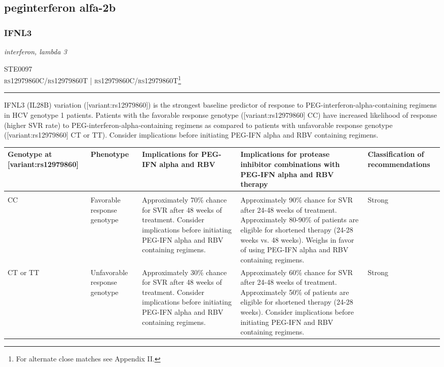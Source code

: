 \documentclass{report}
\begin{document}
\subsection{ peginterferon alfa-2b }

\subsubsection{ IFNL3 }
     \textit{ interferon, lambda 3 } \begin{flushright} \textsc{ STE0097 \\ rs12979860C/rs12979860T  | rs12979860C/rs12979860T\footnote{For alternate close matches see Appendix II.} }\end{flushright}
      \hrule \vspace{6pt}
      IFNL3 (IL28B) variation ([variant:rs12979860]) is the strongest baseline predictor of response to PEG-interferon-alpha-containing regimens in HCV genotype 1 patients.  Patients with the favorable response genotype ([variant:rs12979860] CC) have increased likelihood of response (higher SVR rate) to PEG-interferon-alpha-containing regimens as compared to patients with unfavorable response genotype ([variant:rs12979860] CT or TT). Consider implications before initiating PEG-IFN alpha and RBV containing regimens. \newline
      \scriptsize
      
      \begin{tabularx}{\textwidth}{ XXXXX }
      \textbf{ Genotype at [variant:rs12979860] }&\textbf{ Phenotype }&\textbf{ Implications for PEG-IFN alpha and RBV  }&\textbf{ Implications for protease inhibitor combinations with PEG-IFN alpha and RBV therapy }&\textbf{ Classification of recommendations  } \\ \hline \\  CC & Favorable response genotype & Approximately 70\% chance for SVR  after 48 weeks of treatment. Consider implications before initiating PEG-IFN alpha and RBV containing regimens. & Approximately 90\% chance for SVR after 24-48 weeks of treatment. Approximately 80-90\% of patients are eligible for shortened therapy (24-28 weeks vs. 48 weeks). Weighs in favor of using PEG-IFN alpha and RBV containing regimens.& Strong  \\  CT or TT & Unfavorable response genotype & Approximately 30\% chance for SVR  after 48 weeks of treatment. Consider implications before initiating PEG-IFN alpha and RBV containing regimens. & Approximately 60\% chance for SVR after 24-48 weeks of treatment. Approximately 50\% of patients are eligible for shortened therapy (24-28 weeks). Consider implications before initiating PEG-IFN and RBV containing regimens.& Strong  \\ 
      \end{tabularx}
      
\end{document}
